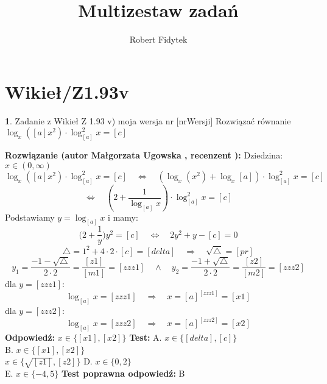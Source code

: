 \documentclass[12pt, a4paper]{article}
\title{Multizestaw zadań}
\author{Robert Fidytek}
\date{}
\theoremstyle{definition} %
\newtheorem{zad}{}
\newcommand{\kategoria}[1]{\section{#1}} %
\newcommand{\zadStart}[1]{\begin{zad}#1\newline} %
\newcommand{\zadStop}{\end{zad}}   %
\newcommand{\rozwStart}[2]{\noindent \textbf{Rozwiązanie (autor #1 , recenzent #2): }\newline} %
\newcommand{\rozwStop}{\newline}                                            %
\newcommand{\odpStart}{\noindent \textbf{Odpowiedź:}\newline}    %
\newcommand{\odpStop}{\newline}                                             %
\newcommand{\testStart}{\noindent \textbf{Test:}\newline} %
\newcommand{\testStop}{\newline} %
\newcommand{\kluczStart}{\noindent \textbf{Test poprawna odpowiedź:}\newline} %
\newcommand{\kluczStop}{\newline} %
\begin{document}
\maketitle


\kategoria{Wikieł/Z1.93v}
\zadStart{Zadanie z Wikieł Z 1.93 v) moja wersja nr [nrWersji]}
Rozwiązać równanie $\log_{x}{([a]x^2)} \cdot \log^2_{[a]}{x} = [c]$
\zadStop
\rozwStart{Małgorzata Ugowska}{}
Dziedzina: $x \in (0, \infty)$
$$ \log_{x}{([a]x^2)} \cdot \log^2_{[a]}{x} = [c] \quad \Longleftrightarrow \quad (\log_{x}{(x^2)}+\log_{x}{[a]}) \cdot \log^2_{[a]}{x} = [c] $$
$$\Longleftrightarrow \quad (2+\frac{1}{\log_{[a]}{x}}) \cdot \log^2_{[a]}{x} = [c] $$
Podstawiamy $y=\log_{[a]}{x}$ i mamy:
$$\Big(2+\frac{1}{y}\Big)y^2=[c] \quad \Longleftrightarrow \quad 2y^2 +y -[c] = 0$$
$$ \bigtriangleup = 1^2 + 4 \cdot 2 \cdot [c] = [delta] \quad  \Longrightarrow \quad \sqrt{\bigtriangleup} = [pr]$$
$$y_1=\frac{-1-\sqrt{\bigtriangleup}}{2\cdot 2} = \frac{[z1]}{[m1]} = [zzz1] \quad \land \quad y_2=\frac{-1+\sqrt{\bigtriangleup}}{2\cdot 2} = \frac{[z2]}{[m2]} = [zzz2]$$
dla $y=[zzz1]$:
$$\log_{[a]}{x} = [zzz1] \quad  \Longrightarrow \quad x = [a]^{[zzz1]} = [x1]$$
dla $y=[zzz2]$:
$$\log_{[a]}{x} = [zzz2] \quad  \Longrightarrow \quad x = [a]^{[zzz2]} = [x2]$$
\rozwStop
\odpStart
$x \in \{[x1],[x2]\}$
\odpStop
\testStart
A. $x \in \{[delta], [c]\}$\\
B. $x \in \{[x1],[x2]\}$\\
$x \in \{\sqrt{[z1]}, [z2]\}$
D. $x \in \{0, 2\}$\\
E. $x \in \{-4, 5\}$
\testStop
\kluczStart
B
\kluczStop
\end{document}
